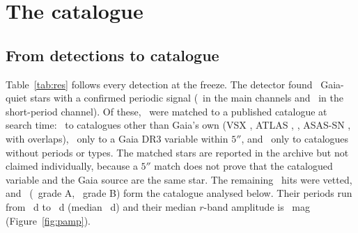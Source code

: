\documentclass[twocolumn]{searchchev_preprint}
\begin{document}




\section{The catalogue}
\subsection{From detections to catalogue}
Table~\ref{tab:res} follows every detection at the freeze. The detector found \nhits\ Gaia-quiet stars with a
confirmed periodic signal (\nhitsmain\ in the main channels and \nhitsshort\ in the short-period channel). Of these,
\nhitsknown\ were matched to a published catalogue at search time: \nhitsknownext\ to catalogues other than Gaia's own
(VSX \nextVSX, ATLAS \nextATLAS, \citealt{Chen2020} \nextChen, ASAS-SN \nextASASSN, with overlaps), \nhitsknowngaianb\
only to a Gaia DR3 variable within $5''$, and \nhitsknownother\ only to catalogues without periods or types. The
matched stars are reported in the archive but not claimed individually, because a $5''$ match does not prove that the
catalogued variable and the Gaia source are the same star. The remaining \nhitstovet\ hits were vetted, and \nnAB\
(\nnA\ grade A, \nnB\ grade B) form the catalogue analysed below. Their periods run from \nPmin\ d to \nPmax\ d (median
\nPmed\ d) and their median $r$-band amplitude is \nampmed\ mag (Figure~\ref{fig:pamp}).
\end{document}
